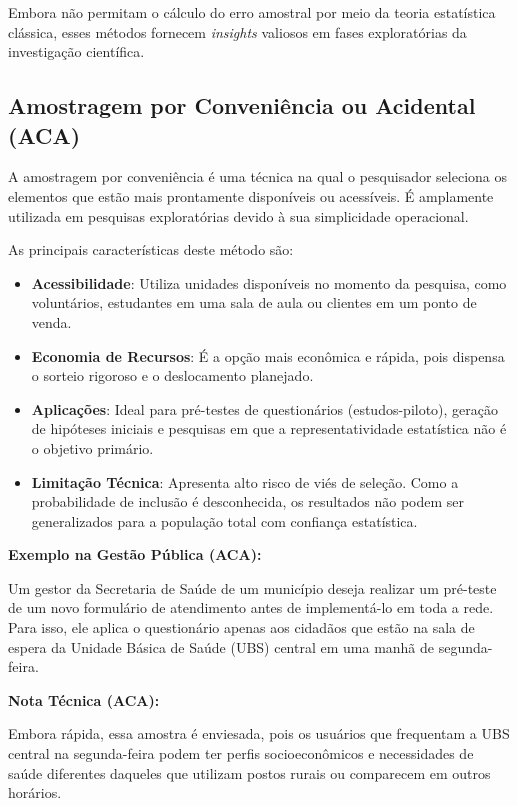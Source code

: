 Embora não permitam o cálculo do erro amostral por meio da teoria estatística clássica, esses métodos fornecem \textit{insights} valiosos em fases exploratórias da investigação científica.

\subsection{Amostragem por Conveniência ou Acidental (ACA)}

A amostragem por conveniência é uma técnica na qual o pesquisador seleciona os elementos que estão mais prontamente disponíveis ou acessíveis. É amplamente utilizada em pesquisas exploratórias devido à sua simplicidade operacional. \vskip0.3cm

As principais características deste método são:

\begin{itemize}
    \item \textbf{Acessibilidade}: Utiliza unidades disponíveis no momento da pesquisa, como voluntários, estudantes em uma sala de aula ou clientes em um ponto de venda.
    \item \textbf{Economia de Recursos}: É a opção mais econômica e rápida, pois dispensa o sorteio rigoroso e o deslocamento planejado.
    \item \textbf{Aplicações}: Ideal para pré-testes de questionários (estudos-piloto), geração de hipóteses iniciais e pesquisas em que a representatividade estatística não é o objetivo primário.
    \item \textbf{Limitação Técnica}: Apresenta alto risco de viés de seleção. Como a probabilidade de inclusão é desconhecida, os resultados não podem ser generalizados para a população total com confiança estatística.
\end{itemize}

\newpage
\textbf{Exemplo na Gestão Pública (ACA):} \vskip0.3cm

Um gestor da Secretaria de Saúde de um município deseja realizar um pré-teste de um novo formulário de atendimento antes de implementá-lo em toda a rede. Para isso, ele aplica o questionário apenas aos cidadãos que estão na sala de espera da Unidade Básica de Saúde (UBS) central em uma manhã de segunda-feira. \vskip0.3cm

\textbf{Nota Técnica (ACA):} \vskip0.3cm

Embora rápida, essa amostra é enviesada, pois os usuários que frequentam a UBS central na segunda-feira podem ter perfis socioeconômicos e necessidades de saúde diferentes daqueles que utilizam postos rurais ou comparecem em outros horários.

